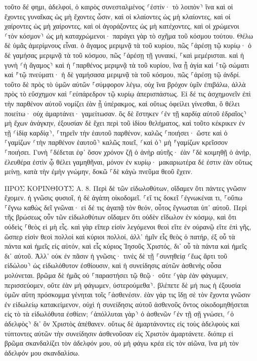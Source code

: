 \documentclass[twoside, 9pt]{extreport}
\begin{document}
τοῦτο δέ φημι, ἀδελφοί, ὁ καιρὸς συνεσταλμένος ⸂ἐστίν· τὸ λοιπὸν⸃ ἵνα καὶ οἱ ἔχοντες γυναῖκας ὡς μὴ ἔχοντες ὦσιν, 
καὶ οἱ κλαίοντες ὡς μὴ κλαίοντες, καὶ οἱ χαίροντες ὡς μὴ χαίροντες, καὶ οἱ ἀγοράζοντες ὡς μὴ κατέχοντες, 
καὶ οἱ χρώμενοι ⸂τὸν κόσμον⸃ ὡς μὴ καταχρώμενοι· παράγει γὰρ τὸ σχῆμα τοῦ κόσμου τούτου. 
Θέλω δὲ ὑμᾶς ἀμερίμνους εἶναι. ὁ ἄγαμος μεριμνᾷ τὰ τοῦ κυρίου, πῶς ⸀ἀρέσῃ τῷ κυρίῳ· 
ὁ δὲ γαμήσας μεριμνᾷ τὰ τοῦ κόσμου, πῶς ⸀ἀρέσῃ τῇ γυναικί, 
⸀καὶ μεμέρισται. καὶ ἡ γυνὴ ⸂ἡ ἄγαμος⸃ καὶ ἡ ⸀παρθένος μεριμνᾷ τὰ τοῦ κυρίου, ἵνα ᾖ ἁγία καὶ ⸀τῷ σώματι καὶ ⸁τῷ πνεύματι· ἡ δὲ γαμήσασα μεριμνᾷ τὰ τοῦ κόσμου, πῶς ⸀ἀρέσῃ τῷ ἀνδρί. 
τοῦτο δὲ πρὸς τὸ ὑμῶν αὐτῶν ⸀σύμφορον λέγω, οὐχ ἵνα βρόχον ὑμῖν ἐπιβάλω, ἀλλὰ πρὸς τὸ εὔσχημον καὶ ⸀εὐπάρεδρον τῷ κυρίῳ ἀπερισπάστως. 
Εἰ δέ τις ἀσχημονεῖν ἐπὶ τὴν παρθένον αὐτοῦ νομίζει ἐὰν ᾖ ὑπέρακμος, καὶ οὕτως ὀφείλει γίνεσθαι, ὃ θέλει ποιείτω· οὐχ ἁμαρτάνει· γαμείτωσαν. 
ὃς δὲ ἕστηκεν ⸂ἐν τῇ καρδίᾳ αὐτοῦ ἑδραῖος⸃ μὴ ἔχων ἀνάγκην, ἐξουσίαν δὲ ἔχει περὶ τοῦ ἰδίου θελήματος, καὶ τοῦτο κέκρικεν ἐν τῇ ⸂ἰδίᾳ καρδίᾳ⸃, ⸀τηρεῖν τὴν ἑαυτοῦ παρθένον, καλῶς ⸀ποιήσει· 
ὥστε καὶ ὁ ⸀γαμίζων ⸂τὴν παρθένον ἑαυτοῦ⸃ καλῶς ποιεῖ, ⸂καὶ ὁ⸃ μὴ ⸁γαμίζων κρεῖσσον ⸀ποιήσει. 
Γυνὴ ⸀δέδεται ἐφ᾽ ὅσον χρόνον ζῇ ὁ ἀνὴρ αὐτῆς· ἐὰν ⸀δὲ κοιμηθῇ ὁ ἀνήρ, ἐλευθέρα ἐστὶν ᾧ θέλει γαμηθῆναι, μόνον ἐν κυρίῳ· 
μακαριωτέρα δέ ἐστιν ἐὰν οὕτως μείνῃ, κατὰ τὴν ἐμὴν γνώμην, δοκῶ ⸀δὲ κἀγὼ πνεῦμα θεοῦ ἔχειν. 

ΠΡΟΣ ΚΟΡΙΝΘΙΟΥΣ Α.
8.
Περὶ δὲ τῶν εἰδωλοθύτων, οἴδαμεν ὅτι πάντες γνῶσιν ἔχομεν. ἡ γνῶσις φυσιοῖ, ἡ δὲ ἀγάπη οἰκοδομεῖ. 
⸀εἴ τις δοκεῖ ⸀ἐγνωκέναι τι, ⸀οὔπω ⸀ἔγνω καθὼς δεῖ γνῶναι· 
εἰ δέ τις ἀγαπᾷ τὸν θεόν, οὗτος ἔγνωσται ὑπ᾽ αὐτοῦ. 
Περὶ τῆς βρώσεως οὖν τῶν εἰδωλοθύτων οἴδαμεν ὅτι οὐδὲν εἴδωλον ἐν κόσμῳ, καὶ ὅτι οὐδεὶς ⸀θεὸς εἰ μὴ εἷς. 
καὶ γὰρ εἴπερ εἰσὶν λεγόμενοι θεοὶ εἴτε ἐν οὐρανῷ εἴτε ἐπὶ γῆς, ὥσπερ εἰσὶν θεοὶ πολλοὶ καὶ κύριοι πολλοί, 
ἀλλ᾽ ἡμῖν εἷς θεὸς ὁ πατήρ, ἐξ οὗ τὰ πάντα καὶ ἡμεῖς εἰς αὐτόν, καὶ εἷς κύριος Ἰησοῦς Χριστός, δι᾽ οὗ τὰ πάντα καὶ ἡμεῖς δι᾽ αὐτοῦ. 
Ἀλλ᾽ οὐκ ἐν πᾶσιν ἡ γνῶσις· τινὲς δὲ τῇ ⸀συνηθείᾳ ⸂ἕως ἄρτι τοῦ εἰδώλου⸃ ὡς εἰδωλόθυτον ἐσθίουσιν, καὶ ἡ συνείδησις αὐτῶν ἀσθενὴς οὖσα μολύνεται. 
βρῶμα δὲ ἡμᾶς οὐ ⸀παραστήσει τῷ θεῷ· οὔτε ⸂γὰρ ἐὰν φάγωμεν, περισσεύομεν, οὔτε ἐὰν μὴ φάγωμεν, ὑστερούμεθα⸃. 
βλέπετε δὲ μή πως ἡ ἐξουσία ὑμῶν αὕτη πρόσκομμα γένηται τοῖς ⸀ἀσθενέσιν. 
ἐὰν γάρ τις ἴδῃ σὲ τὸν ἔχοντα γνῶσιν ἐν εἰδωλείῳ κατακείμενον, οὐχὶ ἡ συνείδησις αὐτοῦ ἀσθενοῦς ὄντος οἰκοδομηθήσεται εἰς τὸ τὰ εἰδωλόθυτα ἐσθίειν; 
⸂ἀπόλλυται γὰρ⸃ ὁ ἀσθενῶν ⸀ἐν τῇ σῇ γνώσει, ⸂ὁ ἀδελφὸς⸃ δι᾽ ὃν Χριστὸς ἀπέθανεν. 
οὕτως δὲ ἁμαρτάνοντες εἰς τοὺς ἀδελφοὺς καὶ τύπτοντες αὐτῶν τὴν συνείδησιν ἀσθενοῦσαν εἰς Χριστὸν ἁμαρτάνετε. 
διόπερ εἰ βρῶμα σκανδαλίζει τὸν ἀδελφόν μου, οὐ μὴ φάγω κρέα εἰς τὸν αἰῶνα, ἵνα μὴ τὸν ἀδελφόν μου σκανδαλίσω. 
\end{document}
